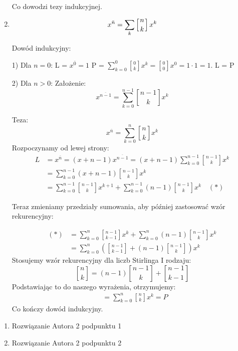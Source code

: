 \documentclass{mwart}
\begin{document}
\begin{mdframed}
\begin{enumerate}
Co dowodzi tezy indukcyjnej.
\newline

\item $$x^{\bar{n}} = \sum_{k} \left[n \atop k \right] x^k$$

Dowód indukcyjny:

1) Dla $n=0$:
\newline
L = $x^{\overline{0}} = 1$
\newline
P = $\sum_{k=0}^0 \genfrac{[}{]}{0pt}{1}{0}{k} x^k = \genfrac{[}{]}{0pt}{1}{0}{0} x^0 = 1 \cdot 1 = 1$.
\newline
L = P
\newline

2) Dla $n>0$: 
\newline
Założenie:
$$x^{\overline{n-1}} = \sum_{k=0}^{n-1} \genfrac{[}{]}{0pt}{1}{n-1}{k} x^k$$

Teza:
$$x^{\overline{n}} = \sum_{k=0}^n \genfrac{[}{]}{0pt}{1}{n}{k} x^k$$
Rozpoczynamy od lewej strony:
\begin{align*}
L &= x^{\overline{n}} = (x+n-1) x^{\overline{n-1}} = (x+n-1) \sum_{k=0}^{n-1} \genfrac{[}{]}{0pt}{1}{n-1}{k} x^k \\
&= \sum_{k=0}^{n-1} (x+n-1) \genfrac{[}{]}{0pt}{1}{n-1}{k} x^k \\
&= \sum_{k=0}^{n-1} \genfrac{[}{]}{0pt}{1}{n-1}{k} x^{k+1} + \sum_{k=0}^{n-1} (n-1) \genfrac{[}{]}{0pt}{1}{n-1}{k} x^k \quad (*)
\end{align*}

Teraz zmieniamy przedziały sumowania, aby później zastosować wzór rekurencyjny:

\begin{align*}
(*) &= \sum_{k=0}^{n} \genfrac{[}{]}{0pt}{1}{n-1}{k-1} x^k + \sum_{k=0}^{n} (n-1) \genfrac{[}{]}{0pt}{1}{n-1}{k} x^k \\
&= \sum_{k=0}^{n} \left(\genfrac{[}{]}{0pt}{1}{n-1}{k-1} + (n-1) \genfrac{[}{]}{0pt}{1}{n-1}{k}\right) x^k
\end{align*}
Stosujemy wzór rekurencyjny dla liczb Stirlinga I rodzaju:
$$\genfrac{[}{]}{0pt}{1}{n}{k} = (n-1)\genfrac{[}{]}{0pt}{1}{n-1}{k} + \genfrac{[}{]}{0pt}{1}{n-1}{k-1}$$
Podstawiając to do naszego wyrażenia, otrzymujemy:
\begin{align*}
&= \sum_{k=0}^{n} \genfrac{[}{]}{0pt}{1}{n}{k} x^k = P
\end{align*}
Co kończy dowód indukcyjny.
    \end{enumerate}
\end{mdframed}
\begin{mdframed}
    \begin{enumerate}
        \item Rozwiązanie Autora 2 podpunktu 1
        \item Rozwiązanie Autora 2 podpunktu 2
    \end{enumerate}
\end{mdframed}
\end{document}
